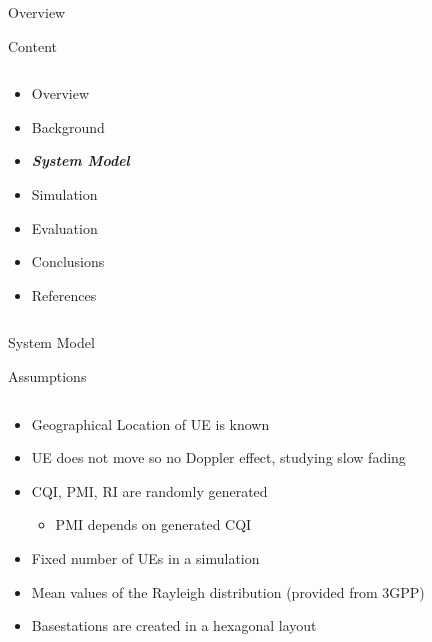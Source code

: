 \documentclass[xcolor={cmyk}]{beamer}
\begin{document}
\begin{frame}{Overview}
	\begin{block}{Content}
		\begin{columns}
			\begin{column}{.9\textwidth}
				\begin{itemize}
					\item Overview
					\item Background
					\item \textbf{\emph{System Model}}
					\item Simulation
					\item Evaluation
					\item Conclusions
					\item References
				\end{itemize}
			\end{column}
		\end{columns}
	\end{block}
\end{frame}

 \begin{frame}{System Model}
	 \begin{block}{Assumptions}
	 	\begin{columns}
			\begin{column}{.9\textwidth}
				\begin{itemize}
					\item Geographical Location of UE is known
					\item UE does not move so no Doppler effect, studying slow fading
					\item CQI, PMI, RI are randomly generated
					\begin{itemize}
						\item PMI depends on generated CQI
					 \end{itemize}
					\item Fixed number of UEs in a simulation
					\item Mean values of the Rayleigh distribution (provided from 3GPP)
					\item Basestations are created in a hexagonal layout
				\end{itemize}
			\end{column}
		\end{columns}
	 \end{block}
 \end{frame}
 
\end{document}
